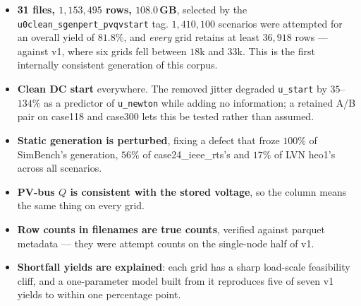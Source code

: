 \documentclass{article}
\begin{document}
\begin{itemize}[leftmargin=*]
\item \textbf{31 files, $1{,}153{,}495$ rows, $108.0$\,GB}, selected by the
  \texttt{u0clean\_sgenpert\_pvqvstart} tag.  $1{,}410{,}100$ scenarios were
  attempted for an overall yield of $81.8\%$, and \emph{every} grid retains at
  least $36{,}918$ rows --- against v1, where six grids fell between $18$k and
  $33$k.  This is the first internally consistent generation of this corpus.
\item \textbf{Clean DC start} everywhere.  The removed jitter degraded
  \texttt{u\_start} by $35$--$134\%$ as a predictor of \texttt{u\_newton} while
  adding no information; a retained A/B pair on case118 and case300 lets this be
  tested rather than assumed.
\item \textbf{Static generation is perturbed}, fixing a defect that froze
  $100\%$ of SimBench's generation, $56\%$ of case24\_ieee\_rts's and $17\%$ of
  LVN heo1's across all scenarios.
\item \textbf{PV-bus $Q$ is consistent with the stored voltage}, so the column
  means the same thing on every grid.
\item \textbf{Row counts in filenames are true counts}, verified against parquet
  metadata --- they were attempt counts on the single-node half of v1.
\item \textbf{Shortfall yields are explained}: each grid has a sharp load-scale
  feasibility cliff, and a one-parameter model built from it reproduces five of
  seven v1 yields to within one percentage point.
\end{itemize}
\end{document}
